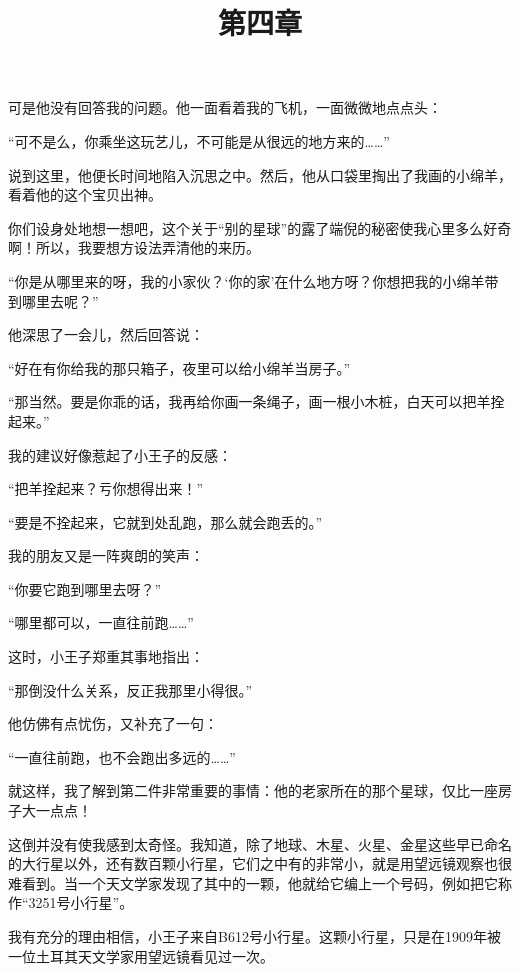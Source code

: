 可是他没有回答我的问题。他一面看着我的飞机，一面微微地点点头：

“可不是么，你乘坐这玩艺儿，不可能是从很远的地方来的\ldots{}\ldots{}”

说到这里，他便长时间地陷入沉思之中。然后，他从口袋里掏出了我画的小绵羊，看着他的这个宝贝出神。

你们设身处地想一想吧，这个关于“别的星球”的露了端倪的秘密使我心里多么好奇啊！所以，我要想方设法弄清他的来历。

“你是从哪里来的呀，我的小家伙？‘你的家'在什么地方呀？你想把我的小绵羊带到哪里去呢？”

他深思了一会儿，然后回答说：

“好在有你给我的那只箱子，夜里可以给小绵羊当房子。”

“那当然。要是你乖的话，我再给你画一条绳子，画一根小木桩，白天可以把羊拴起来。”

我的建议好像惹起了小王子的反感：

“把羊拴起来？亏你想得出来！”

“要是不拴起来，它就到处乱跑，那么就会跑丢的。”

我的朋友又是一阵爽朗的笑声：

“你要它跑到哪里去呀？”

“哪里都可以，一直往前跑\ldots{}\ldots{}”

这时，小王子郑重其事地指出：

“那倒没什么关系，反正我那里小得很。”

他仿佛有点忧伤，又补充了一句：

“一直往前跑，也不会跑出多远的\ldots{}\ldots{}”

{\startalignment[center]
 \stopalignment}

\title{第四章}

就这样，我了解到第二件非常重要的事情：他的老家所在的那个星球，仅比一座房子大一点点！

这倒并没有使我感到太奇怪。我知道，除了地球、木星、火星、金星这些早已命名的大行星以外，还有数百颗小行星，它们之中有的非常小，就是用望远镜观察也很难看到。当一个天文学家发现了其中的一颗，他就给它编上一个号码，例如把它称作“3251号小行星”。

{\startalignment[center]
 \stopalignment}

我有充分的理由相信，小王子来自B612号小行星。这颗小行星，只是在1909年被一位土耳其天文学家用望远镜看见过一次。

